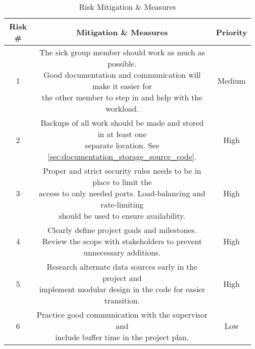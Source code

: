 \begin{table}[H]
    \centering
    \begin{tabular}{|c|c|c|}
    \hline
    Risk \# & Mitigation \& Measures & Priority \\
    \hline
    1 & \makecell{The sick group member should work as much as possible. \\ Good documentation and communication will make it easier for \\ the other member to step in and help with the workload.} & Medium \cellcolor[HTML]{fff000} \\
    \hline
    2 & \makecell{Backups of all work should be made and stored in at least one \\separate location. See \ref{sec:documentation_storage_source_code}.} & High \cellcolor[HTML]{ff4233} \\
    \hline
    3 & \makecell{Proper and strict security rules needs to be in place to limit the \\access to only needed ports. Load-balancing and rate-limiting \\should be used to ensure availability.} & High \cellcolor[HTML]{ff4233} \\
    \hline
    4 & \makecell{Clearly define project goals and milestones. \\ Review the scope with stakeholders to prevent unnecessary additions.} & High \cellcolor[HTML]{ff4233} \\
    \hline
    5 & \makecell{Research alternate data sources early in the project and \\ implement modular design in the code for easier transition.} & High \cellcolor[HTML]{ff4233} \\
    \hline
    6 & \makecell{Practice good communication with the supervisor and \\ include buffer time in the project plan.} & Low \cellcolor[HTML]{74ff00} \\
    \hline
    \end{tabular}
    \caption{Risk Mitigation \& Measures}
    \label{tab:risk_mitigation}
\end{table}